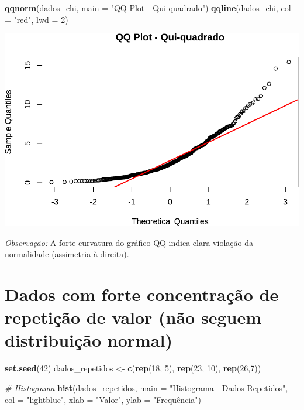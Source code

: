 \documentclass[
]{book}
\newenvironment{Shaded}{\begin{snugshade}}{\end{snugshade}}
\newcommand{\AttributeTok}[1]{\textcolor[rgb]{0.13,0.29,0.53}{#1}}
\newcommand{\CommentTok}[1]{\textcolor[rgb]{0.56,0.35,0.01}{\textit{#1}}}
\newcommand{\DecValTok}[1]{\textcolor[rgb]{0.00,0.00,0.81}{#1}}
\newcommand{\FunctionTok}[1]{\textcolor[rgb]{0.13,0.29,0.53}{\textbf{#1}}}
\newcommand{\NormalTok}[1]{#1}
\newcommand{\OtherTok}[1]{\textcolor[rgb]{0.56,0.35,0.01}{#1}}
\newcommand{\StringTok}[1]{\textcolor[rgb]{0.31,0.60,0.02}{#1}}
\begin{document}
\begin{Shaded}
\begin{Highlighting}[]
\FunctionTok{qqnorm}\NormalTok{(dados\_chi, }\AttributeTok{main =} \StringTok{"QQ Plot {-} Qui{-}quadrado"}\NormalTok{)}
\FunctionTok{qqline}\NormalTok{(dados\_chi, }\AttributeTok{col =} \StringTok{"red"}\NormalTok{, }\AttributeTok{lwd =} \DecValTok{2}\NormalTok{)}
\end{Highlighting}
\end{Shaded}

\includegraphics{Livro-Estatistica+R_files/figure-latex/nnormal-3.pdf}

\emph{Observação:} A forte curvatura do gráfico QQ indica clara violação da normalidade (assimetria à direita).

\section{Dados com forte concentração de repetição de valor (não seguem distribuição normal)}\label{dados-com-forte-concentrauxe7uxe3o-de-repetiuxe7uxe3o-de-valor-nuxe3o-seguem-distribuiuxe7uxe3o-normal}

\begin{Shaded}
\begin{Highlighting}[]
\FunctionTok{set.seed}\NormalTok{(}\DecValTok{42}\NormalTok{)}
\NormalTok{dados\_repetidos }\OtherTok{\textless{}{-}} \FunctionTok{c}\NormalTok{(}\FunctionTok{rep}\NormalTok{(}\DecValTok{18}\NormalTok{, }\DecValTok{5}\NormalTok{), }\FunctionTok{rep}\NormalTok{(}\DecValTok{23}\NormalTok{, }\DecValTok{10}\NormalTok{), }\FunctionTok{rep}\NormalTok{(}\DecValTok{26}\NormalTok{,}\DecValTok{7}\NormalTok{)) }

\CommentTok{\# Histograma}
\FunctionTok{hist}\NormalTok{(dados\_repetidos, }\AttributeTok{main =} \StringTok{"Histograma {-} Dados Repetidos"}\NormalTok{, }\AttributeTok{col =} \StringTok{"lightblue"}\NormalTok{, }\AttributeTok{xlab =} \StringTok{"Valor"}\NormalTok{, }\AttributeTok{ylab =} \StringTok{"Frequência"}\NormalTok{)}
\end{Highlighting}
\end{Shaded}
\end{document}
